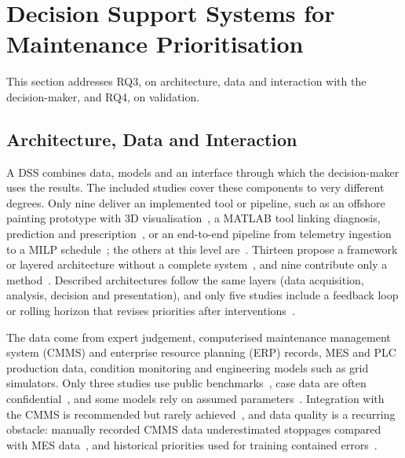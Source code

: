 \section{Decision Support Systems for Maintenance Prioritisation}
\label{sec:systems}

This section addresses RQ3, on architecture, data and interaction with the decision-maker, and RQ4, on validation.

\subsection{Architecture, Data and Interaction}
\label{sec:sys-architecture}

A DSS combines data, models and an interface through which the decision-maker uses the results. The included studies cover these components to very different degrees. Only nine deliver an implemented tool or pipeline, such as an offshore painting prototype with 3D visualisation~\cite{rios2024}, a MATLAB tool linking diagnosis, prediction and prescription~\cite{wittbrodt2026}, or an end-to-end pipeline from telemetry ingestion to a MILP schedule~\cite{danach2026}; the others at this level are~\cite{gao2024,wehbi2026,darko2026,astepe2021,tang2026,li2027}. Thirteen propose a framework or layered architecture without a complete system~\cite{delgado2026,gopalakrishnan2022,rios2025,hall2021,dui2025,dui2026,zhou2024,geng2022,panwar2021,bahadir2026,bahrami2021,shaulagara2023,moradi2024}, and nine contribute only a method~\cite{ozcan2021,bulut2021,yang2021,schulze2022,enjavimadar2022,woller2023,qiu2026,hedayatnia2025,bi2022}. Described architectures follow the same layers (data acquisition, analysis, decision and presentation), and only five studies include a feedback loop or rolling horizon that revises priorities after interventions~\cite{gopalakrishnan2022,delgado2026,rios2025,hall2021,danach2026}.

The data come from expert judgement, computerised maintenance management system (CMMS) and enterprise resource planning (ERP) records, MES and PLC production data, condition monitoring and engineering models such as grid simulators. Only three studies use public benchmarks~\cite{tang2026,woller2023,danach2026}, case data are often confidential~\cite{rios2025,wittbrodt2026,danach2026,li2027}, and some models rely on assumed parameters~\cite{schulze2022,dui2025,geng2022}. Integration with the CMMS is recommended but rarely achieved~\cite{delgado2026,enjavimadar2022}, and data quality is a recurring obstacle: manually recorded CMMS data underestimated stoppages compared with MES data~\cite{gopalakrishnan2022}, and historical priorities used for training contained errors~\cite{astepe2021}.

